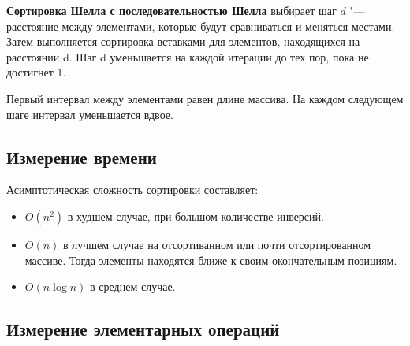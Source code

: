 \documentclass[11pt]{article}
\begin{document}
\textbf{Сортировка Шелла с последовательностью Шелла} выбирает шаг $d$ "--- расстояние между элементами, которые
будут сравниваться и меняться местами. Затем выполняется сортировка вставками для элементов,
находящихся на расстоянии d. Шаг d уменьшается на каждой итерации до тех пор, пока не достигнет 1.

Первый интервал между элементами равен длине массива. На каждом
следующем шаге интервал уменьшается вдвое.

\setcounter{subsection}{0}
\subsection{Измерение времени}

\begin{center}
\end{center}
{ \hspace*{\fill} }

\begin{center}
\end{center}
{ \hspace*{\fill} }

Асимптотическая сложность сортировки составляет:
\begin{itemize}
    \item $O(n^2)$ в худшем случае, при большом количестве инверсий.
    \item $O(n)$ в лучшем случае на отсортиванном или почти отсортированном массиве. Тогда элементы находятся ближе к своим окончательным
    позициям.
    \item $O(n\log n)$ в среднем случае.
\end{itemize}

\subsection{Измерение элементарных операций}

\begin{center}
\end{center}
{ \hspace*{\fill} }

\begin{center}
\end{center}
{ \hspace*{\fill} }
\end{document}

